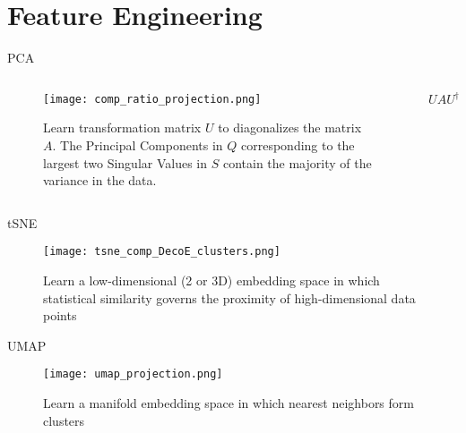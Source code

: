 \documentclass[10pt, compress]{beamer}
\begin{document}
\section{Feature Engineering}
\label{sec:org94a9cbe}
\begin{frame}[label={sec:org849c1df}]{PCA}
\begin{columns}
\begin{column}{0.8\columnwidth}
\begin{figure}[htbp]
\centering
\texttt{[image: comp\_ratio\_projection.png]}
\caption{Learn transformation matrix \(U\) to diagonalizes the matrix \(A\). The Principal Components in \(Q\) corresponding to the largest two Singular Values in \(S\) contain the majority of the variance in the data.}
\end{figure}
\end{column}
\begin{column}{0.2\columnwidth}
\[
UAU^\dag = Q^{-1}SQ
\]
\end{column}
\end{columns}
\end{frame}
\begin{frame}[label={sec:org5932adb}]{tSNE}
\begin{figure}[htbp]
\centering
\texttt{[image: tsne\_comp\_DecoE\_clusters.png]}
\caption{Learn a low-dimensional (2 or 3D) embedding space in which statistical similarity governs the proximity of high-dimensional data points}
\end{figure}
\end{frame}
\begin{frame}[label={sec:org793a9b6}]{UMAP}
\begin{figure}[htbp]
\centering
\texttt{[image: umap\_projection.png]}
\caption{Learn a manifold embedding space in which nearest neighbors form clusters}
\end{figure}
\end{frame}
\end{document}
